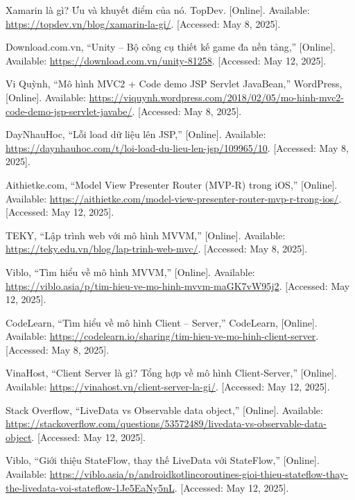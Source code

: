 \documentclass[12pt]{report}
\begin{document}
\begin{thebibliography}{1}
  Xamarin là gì? Ưu và khuyết điểm của nó. TopDev. [Online]. Available: \url{https://topdev.vn/blog/xamarin-la-gi/}. [Accessed: May 8, 2025].


  Download.com.vn, “Unity – Bộ công cụ thiết kế game đa nền tảng,” [Online]. Available: \url{https://download.com.vn/unity-81258}. [Accessed: May 12, 2025].

  Vi Quỳnh, “Mô hình MVC2 + Code demo JSP Servlet JavaBean,” WordPress, [Online]. Available: \url{https://viquynh.wordpress.com/2018/02/05/mo-hinh-mvc2-code-demo-jsp-servlet-javabe/}. [Accessed: May 8, 2025].

  DayNhauHoc, “Lỗi load dữ liệu lên JSP,” [Online]. Available: \url{https://daynhauhoc.com/t/loi-load-du-lieu-len-jsp/109965/10}. [Accessed: May 8, 2025].


  Aithietke.com, “Model View Presenter Router (MVP-R) trong iOS,” [Online]. Available: \url{https://aithietke.com/model-view-presenter-router-mvp-r-trong-ios/}. [Accessed: May 12, 2025].


  TEKY, “Lập trình web với mô hình MVVM,” [Online]. Available: \url{https://teky.edu.vn/blog/lap-trinh-web-mvc/}. [Accessed: May 8, 2025].



  Viblo, “Tìm hiểu về mô hình MVVM,” [Online]. Available: \url{https://viblo.asia/p/tim-hieu-ve-mo-hinh-mvvm-maGK7vW95j2}. [Accessed: May 12, 2025].


  CodeLearn, “Tìm hiểu về mô hình Client – Server,” CodeLearn, [Online]. Available: \url{https://codelearn.io/sharing/tim-hieu-ve-mo-hinh-client-server}. [Accessed: May 8, 2025].


  VinaHost, “Client Server là gì? Tổng hợp về mô hình Client-Server,” [Online]. Available: \url{https://vinahost.vn/client-server-la-gi/}. [Accessed: May 12, 2025].

  
  
  Stack Overflow, “LiveData vs Observable data object,” [Online]. Available: \url{https://stackoverflow.com/questions/53572489/livedata-vs-observable-data-object}. [Accessed: May 12, 2025].

  
  Viblo, “Giới thiệu StateFlow, thay thế LiveData với StateFlow,” [Online]. Available: \url{https://viblo.asia/p/androidkotlincoroutines-gioi-thieu-stateflow-thay-the-livedata-voi-stateflow-1Je5EaNy5nL}. [Accessed: May 12, 2025].


\end{thebibliography}
\end{document}
